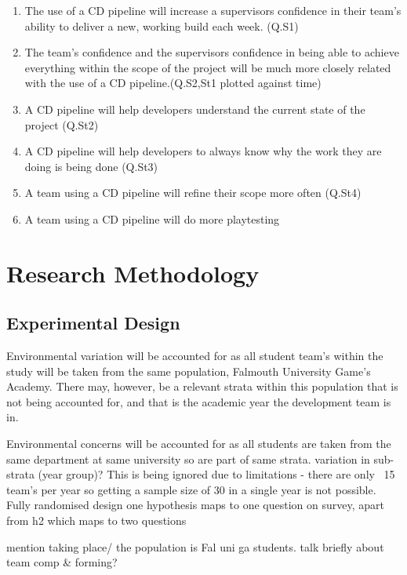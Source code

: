 \documentclass[lettersize,journal]{IEEEtran}
\begin{document}
    \begin{enumerate}
        \item \label{h1} The use of a CD pipeline will increase a supervisors confidence in their team's ability to deliver a new, working build each week. (Q.S1)
        \item \label{h2} The team's confidence and the supervisors confidence in being able to achieve everything within the scope of the project will be much more closely related with the use of a CD pipeline.(Q.S2,St1 plotted against time)
        \item \label{h3} A CD pipeline will help developers understand the current state of the project (Q.St2)
        \item \label{h4} A CD pipeline will help developers to always know why the work they are doing is being done (Q.St3)
        \item \label{h5} A team using a CD pipeline will refine their scope more often (Q.St4)
        \item \label{h6} A team using a CD pipeline will do more playtesting
    \end{enumerate}

\section{Research Methodology}
    \subsection{Experimental Design}
        Environmental variation will be accounted for as all student team's within the study will be taken from the same population, Falmouth University Game's Academy. There may, however, be a relevant strata within this population that is not being accounted for, and that is the academic year the development team is in.
        
        Environmental concerns will be accounted for as all students are taken from the same department at same university so are part of same strata. 
        variation in sub-strata (year group)? This is being ignored due to limitations - there are only ~15 team's per year so getting a sample size of 30 in a single year is not possible. Fully randomised design
        one hypothesis maps to one question on survey, apart from h2 which maps to two questions
    
        mention taking place/ the population is Fal uni ga students. talk briefly about team comp \& forming?
    
\end{document}
